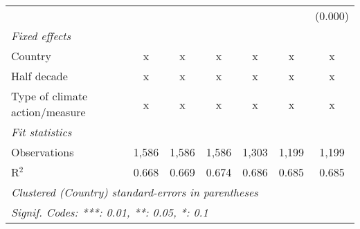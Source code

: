 \begin{tabular}{lcccccc}
                                                  &         &         &                &                &                & (0.000)\\   
   \emph{Fixed effects}\\
   Country                                        & x       & x       & x              & x              & x              & x\\  
   Half decade                                    & x       & x       & x              & x              & x              & x\\  
   Type of climate action/measure                 & x       & x       & x              & x              & x              & x\\  
   \midrule \emph{Fit statistics}\\
   Observations                                   & 1,586   & 1,586   & 1,586          & 1,303          & 1,199          & 1,199\\  
   R$^2$                                          & 0.668   & 0.669   & 0.674          & 0.686          & 0.685          & 0.685\\  
   \midrule
   \multicolumn{7}{l}{\emph{Clustered (Country) standard-errors in parentheses}}\\
   \multicolumn{7}{l}{\emph{Signif. Codes: ***: 0.01, **: 0.05, *: 0.1}}\\
\end{tabular}
\par\endgroup


